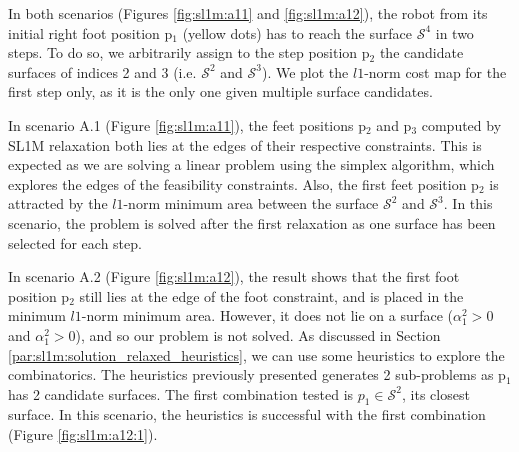 In both scenarios (Figures \ref{fig:sl1m:a11} and \ref{fig:sl1m:a12}), the robot from its initial right foot position p$_1$ (yellow dots) has to reach the surface $\mathcal{S}^4$ in two steps. 
To do so, we arbitrarily assign to the step position p$_2$ the candidate surfaces of indices 2 and 3 (i.e. $\mathcal{S}^2$ and $\mathcal{S}^3$).
We plot the $l1$-norm cost map for the first step only, as it is the only one given multiple surface candidates.

In scenario A.1 (Figure \ref{fig:sl1m:a11}), the feet positions p$_2$ and p$_3$ computed by SL1M relaxation both lies at the edges of their respective constraints. 
This is expected as we are solving a linear problem using the simplex algorithm, which explores the edges of the feasibility constraints.
Also, the first feet position p$_2$ is attracted by the $l1$-norm minimum area between the surface $\mathcal{S}^2$ and $\mathcal{S}^3$. 
In this scenario, the problem is solved after the first relaxation as one surface has been selected for each step.

In scenario A.2 (Figure \ref{fig:sl1m:a12}), the result shows that the first foot position p$_2$ still lies at the edge of the foot constraint, and is placed in the minimum $l1$-norm minimum area. 
However, it does not lie on a surface ($\alpha_1^2 > 0$ and $\alpha_1^2 > 0$), and so our problem is not solved.
As discussed in Section \ref{par:sl1m:solution_relaxed_heuristics}, we can use some heuristics to explore the combinatorics. 
The heuristics previously presented generates 2 sub-problems as p$_1$ has 2 candidate surfaces.
The first combination tested is $p_1 \in \mathcal{S}^2$, its closest surface.
In this scenario, the heuristics is successful with the first combination (Figure \ref{fig:sl1m:a12:1}).

